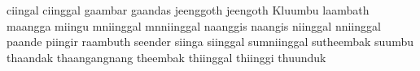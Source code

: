 ciingal
ciinggal
gaambar
gaandas
jeenggoth
jeengoth
Kluumbu
laambath
maangga
miingu
mniinggal
mnniinggal
naanggis
naangis
niinggal
nniinggal
paande
piingir
raambuth
seender
siinga
siinggal
sumniinggal
sutheembak
suumbu
thaandak
thaangangnang
theembak
thiinggal
thiinggi
thuunduk

